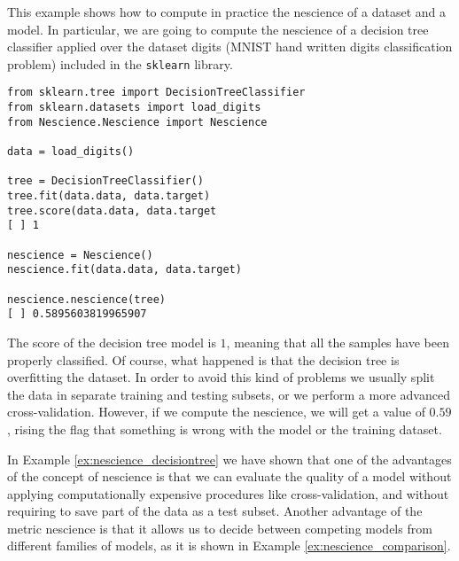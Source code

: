 \begin{example}
\label{ex:nescience_decisiontree}

This example shows how to compute in practice the nescience of a dataset and a model. In particular, we are going to compute the nescience of a decision tree classifier applied over the dataset digits (MNIST hand written digits classification problem) included in the \texttt{sklearn} library.

\begin{sourcecode}
{\scriptsize \begin{verbatim}
from sklearn.tree import DecisionTreeClassifier
from sklearn.datasets import load_digits
from Nescience.Nescience import Nescience

data = load_digits()

tree = DecisionTreeClassifier()
tree.fit(data.data, data.target)
tree.score(data.data, data.target
[ ] 1

nescience = Nescience()
nescience.fit(data.data, data.target)

nescience.nescience(tree)
[ ] 0.5895603819965907
\end{verbatim}}
\end{sourcecode}

The score of the decision tree model is $1$, meaning that all the samples have been properly classified. Of course, what happened is that the decision tree is overfitting the dataset. In order to avoid this kind of problems we usually split the data in separate training and testing subsets, or we perform a more advanced cross-validation. However, if we compute the nescience, we will get a value of $0.59$, rising the flag that something is wrong with the model or the training dataset.

\end{example}

In Example \ref{ex:nescience_decisiontree} we have shown that one of the advantages of the concept of nescience is that we can evaluate the quality of a model without applying computationally expensive procedures like cross-validation, and without requiring to save part of the data as a test subset. Another advantage of the metric nescience is that it allows us to decide between competing models from different families of models, as it is shown in Example \ref{ex:nescience_comparison}.

